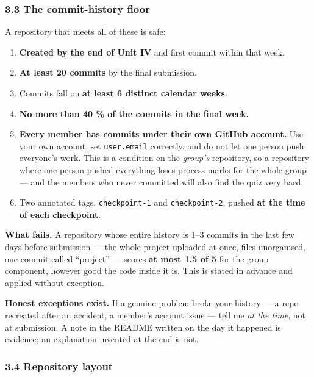 \documentclass[11pt]{article}
\providecommand{\tightlist}{\setlength{\itemsep}{0pt}\setlength{\parskip}{0pt}}
\begin{document}
\hypertarget{the-commit-history-floor}{%
\subsubsection{3.3 The commit-history floor}\label{the-commit-history-floor}}

A repository that meets all of these is safe:

\begin{enumerate}
\def\labelenumi{\arabic{enumi}.}
\tightlist
\item
  \textbf{Created by the end of Unit IV} and first commit within that week.
\item
  \textbf{At least 20 commits} by the final submission.
\item
  Commits fall on \textbf{at least 6 distinct calendar weeks}.
\item
  \textbf{No more than 40 \% of the commits in the final week.}
\item
  \textbf{Every member has commits under their own GitHub account.} Use your own
  account, set \texttt{user.email} correctly, and do not let one person push everyone's
  work. This is a condition on the \emph{group's} repository, so a repository where
  one person pushed everything loses process marks for the whole group --- and the
  members who never committed will also find the quiz very hard.
\item
  Two annotated tags, \texttt{checkpoint-1} and \texttt{checkpoint-2}, pushed \textbf{at the time of
  each checkpoint}.
\end{enumerate}

\textbf{What fails.} A repository whose entire history is 1--3 commits in the last few
days before submission --- the whole project uploaded at once, files unorganised, one commit called
``project'' --- scores \textbf{at most 1.5 of 5} for the group component, however good the
code inside it is. This is stated in advance and applied without exception.

\textbf{Honest exceptions exist.} If a genuine problem broke your history --- a repo
recreated after an accident, a member's account issue --- tell me \emph{at the time},
not at submission. A note in the README written on the day it happened is
evidence; an explanation invented at the end is not.

\hypertarget{repository-layout}{%
\subsubsection{3.4 Repository layout}\label{repository-layout}}
\end{document}
